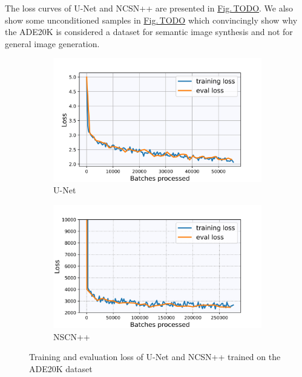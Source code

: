The loss curves of U-Net and NCSN++ are presented in \hyperref[fig:]{Fig.\,TODO}. We also show some unconditioned samples in \hyperref[fig:]{Fig.\,TODO} which convincingly show why the ADE20K is considered a dataset for semantic image synthesis and not for general image generation.

%
\begin{figure}[] \label{fig:3.2}
    \centering
    \begin{subfigure}[b]{0.49\textwidth}
        \includegraphics[width=\textwidth]{Chapters/figures/experiments/ade/loss_ade_seg.jpg}
        \caption{U-Net}
    \end{subfigure}
    \begin{subfigure}[b]{0.49\textwidth}
        \includegraphics[width=\textwidth]{Chapters/figures/experiments/ade/loss_ade_ncsn.jpg}
        \caption{NSCN++}
    \end{subfigure}
    \caption[Losses of U-Net/NCSN++ on ADE20K dataset]{Training and evaluation loss of U-Net and NCSN++ trained on the ADE20K dataset}
\end{figure}
